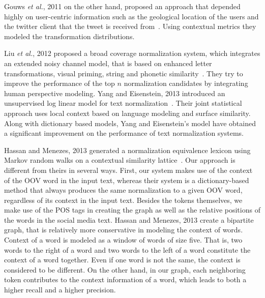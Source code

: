 \documentclass[a4paper,onesided,12pt]{report}
\begin{document}
Gouws \textit{et al.}, 2011 on the other hand, proposed an approach that depended highly on user-centric information such as the geological location of the users and the twitter client that the tweet is received from~\cite{Gouws:2011:CBL:2021109.2021113}. Using contextual metrics they modeled the transformation distributions.

Liu \textit{et al.}, 2012 proposed a broad coverage normalization system, which integrates an extended noisy channel model, that is based on enhanced letter transformations, visual priming, string and phonetic similarity~\cite{liu2012broad}. They try to improve the performance of the top $n$ normalization candidates by integrating human perspective modeling.
Yang and Eisenstein, 2013 introduced an unsupervised log linear model for text normalization~\cite{DBLP:conf/emnlp/YangE13}. Their joint statistical approach uses local context based on language modeling and surface similarity. Along with dictionary based models, Yang and Eisenstein's model have obtained a significant improvement on the performance of text normalization systems.

Hassan and Menezes, 2013 generated a normalization equivalence lexicon using Markov random walks on a contextual similarity lattice~\cite{DBLP:conf/acl/HassanM13}. Our approach is different from theirs in several ways. First, our system makes use of the context of the OOV word in the input text, whereas their system is a dictionary-based method that always produces the same normalization to a given OOV word, regardless of its context in the input text. Besides the tokens themselves, we make use of the POS tags in creating the graph as well as the relative positions of the words in the social media text. Hassan and Menezes, 2013 create a bipartite graph, that is relatively more conservative in modeling the context of words. Context of a word is modeled as a window of words of size five. That is, two words to the right of a word and two words to the left of a word constitute the context of a word together. Even if one word is not the same, the context is considered to be different. On the other hand, in our graph, each neighboring token contributes to the context information of a word, which leads to both a higher recall and a higher precision.
\end{document}
